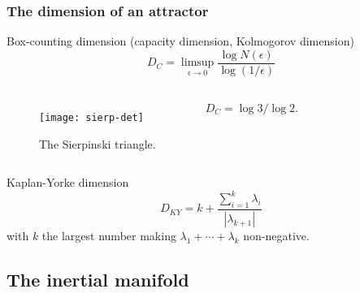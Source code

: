 \begin{frame}[shrink]%
  \frametitle{The dimension of an attractor}

  \begin{block}{Box-counting dimension (capacity dimension, Kolmogorov dimension)}
    \[
      D_C = \limsup_{\epsilon \to 0} \frac{\log N(\epsilon)}{\log(1/\epsilon)}
    \]
  \end{block}

  \begin{columns}[C] %

    \begin{figure}[h]
      \centering
      \texttt{[image: sierp-det]}
      \caption[The Sierpinski striangle]{
        The Sierpinski triangle.
      }
      \label{fig:sier-tri}
    \end{figure}

    $D_C = \log 3/ \log 2$.

  \end{columns}

  \pause

  \begin{block}{\small Kaplan-Yorke dimension\cite{KapYor79a, FKYY83}}
    \[
      D_{KY} = k + \frac{\sum_{i=1}^{k} \lambda_i}{|\lambda_{k+1}|}
    \]
    with $k$ the largest number making $\lambda_1 + \cdots + \lambda_k$
    non-negative.
  \end{block}

\end{frame}

\subsection{The inertial manifold}

